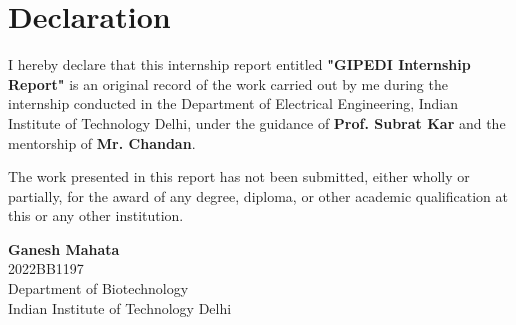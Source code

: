 \chapter*{Declaration}

I hereby declare that this internship report entitled
\textbf{"GIPEDI Internship Report"} is an original record of the work carried out by me during the internship conducted in the Department of Electrical Engineering, Indian Institute of Technology Delhi, under the guidance of \textbf{Prof. Subrat Kar} and the mentorship of \textbf{Mr. Chandan}.

The work presented in this report has not been submitted, either wholly or partially, for the award of any degree, diploma, or other academic qualification at this or any other institution.

\vspace{2cm}

\begin{flushright}
\textbf{Ganesh Mahata}\\
2022BB1197\\
Department of Biotechnology\\
Indian Institute of Technology Delhi
\end{flushright}

\clearpage